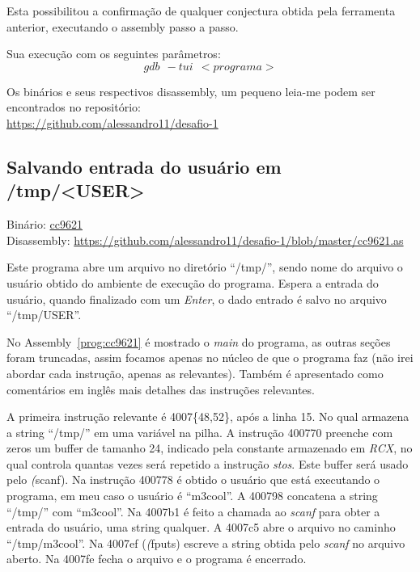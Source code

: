 Esta possibilitou a confirmação de qualquer conjectura obtida pela
ferramenta anterior, executando o assembly passo a passo.

Sua execução com os seguintes parâmetros:
$$gdb \ \ -tui \ \ <programa>$$

Os binários e seus respectivos disassembly, um pequeno leia-me podem
ser encontrados no repositório:\\

\href{https://github.com/alessandro11/desafio-1}{https://github.com/alessandro11/desafio-1}


\subsection{Salvando entrada do usuário em /tmp/<USER>}
\noindent Binário: \href{https://s3.amazonaws.com/chaordic-desafio-cloud/cc9621}{cc9621}\\
Disassembly: \href{https://github.com/alessandro11/desafio-1/blob/master/cc9621.as}{https://github.com/alessandro11/desafio-1/blob/master/cc9621.as}

Este programa abre um arquivo no diretório ``/tmp/'', sendo nome do
arquivo o usuário obtido do ambiente de execução do programa. Espera a
entrada do usuário, quando finalizado com um \emph{Enter}, o
dado entrado é salvo no arquivo ``/tmp/USER''.



No Assembly~\ref{prog:cc9621} é mostrado o \emph{main} do programa, as
outras seções foram truncadas, assim focamos apenas no núcleo de que o
programa faz (não irei abordar cada instrução, apenas as
relevantes). Também é apresentado como comentários em inglês mais
detalhes das instruções relevantes.

A primeira instrução relevante é 4007\{48,52\}, após a linha 15. No qual
armazena a string ``/tmp/'' em uma variável na pilha. A instrução
400770 preenche com zeros um buffer de tamanho 24, indicado pela
constante armazenado em \emph{RCX}, no qual controla quantas vezes será
repetido a instrução \emph{stos}. Este buffer será usado pelo
\emph(scanf). Na instrução 400778 é obtido o usuário que está
executando o programa, em meu caso o usuário é ``m3cool''. A 400798
concatena a string ``/tmp/'' com ``m3cool''. Na 4007b1 é feito a
chamada ao \emph{scanf} para obter a entrada do usuário, uma string
qualquer. A 4007c5 abre o arquivo no caminho ``/tmp/m3cool''. Na
4007ef (\emph(fputs) escreve a string obtida pelo \emph{scanf} no
arquivo aberto. Na 4007fe fecha o arquivo e o programa é encerrado.


